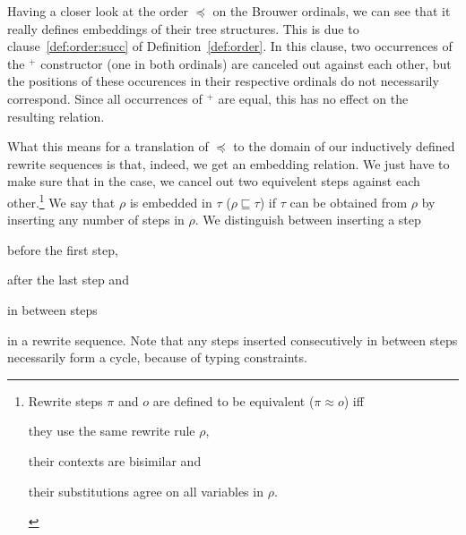 Having a closer look at the order $\preceq$ on the Brouwer ordinals, we can
see that it really defines embeddings of their tree structures. This is due to
clause~\ref{def:order:succ} of Definition~\ref{def:order}. In this clause,
two occurrences of the $^+$ constructor (one in both ordinals) are canceled
out against each other, but the positions of these occurences in their
respective ordinals do not necessarily correspond. Since all occurrences of
$^+$ are equal, this has no effect on the resulting relation.

What this means for a translation of $\preceq$ to the domain of our
inductively defined rewrite sequences is that, indeed, we get an embedding
relation. We just have to make sure that in the
 case, we cancel out two
equivelent steps against each other.\footnote{Rewrite steps $\pi$ and $o$ are
  defined to be equivalent ($\pi \approx o$) iff %
\begin{compactenum}
  \item they use the same rewrite rule $\rho$,
  \item their contexts are bisimilar and
  \item their substitutions agree on all variables in $\rho$.
\end{compactenum}}
We say that $\rho$ is embedded in $\tau$ ($\rho \sqsubseteq \tau$) if $\tau$
can be obtained from $\rho$ by inserting any number of steps in $\rho$. We
distinguish between inserting a step
\begin{inparaenum}[(i)]
  \item before the first step,
  \item after the last step and
  \item in between steps
\end{inparaenum}
in a rewrite sequence. Note that any steps inserted consecutively in between
steps necessarily form a cycle, because of typing constraints.
